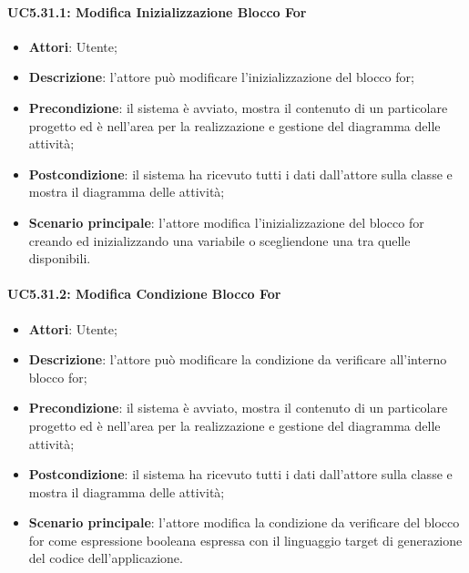 \paragraph{UC5.31.1: Modifica Inizializzazione Blocco For}
\label{UC5.31.1}
\begin{itemize}
	\item \textbf{Attori}: Utente;
	\item \textbf{Descrizione}: l'attore può modificare l'inizializzazione del blocco for;
	\item \textbf{Precondizione}: il sistema è avviato, mostra il contenuto di un particolare progetto ed è nell'area per la realizzazione e gestione del diagramma delle attività;
	\item \textbf{Postcondizione}: il sistema ha ricevuto tutti i dati dall'attore sulla classe e mostra il diagramma delle attività;
	\item \textbf{Scenario principale}: l'attore modifica l'inizializzazione del blocco for creando ed inizializzando una variabile o scegliendone una tra quelle disponibili.
\end{itemize}

\paragraph{UC5.31.2: Modifica Condizione Blocco For}
\label{UC5.531.2}
\begin{itemize}
	\item \textbf{Attori}: Utente;
	\item \textbf{Descrizione}: l'attore può modificare la condizione da verificare all'interno blocco for;
	\item \textbf{Precondizione}: il sistema è avviato, mostra il contenuto di un particolare progetto ed è nell'area per la realizzazione e gestione del diagramma delle attività;
	\item \textbf{Postcondizione}: il sistema ha ricevuto tutti i dati dall'attore sulla classe e mostra il diagramma delle attività;
	\item \textbf{Scenario principale}: l'attore modifica la condizione da verificare del blocco for come espressione booleana espressa con il linguaggio target di generazione del codice dell'applicazione.
\end{itemize}

